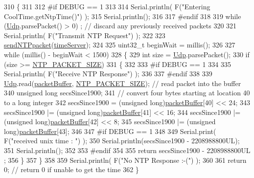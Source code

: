\begin{DoxyCode}
310 \{
311 
312 \textcolor{preprocessor}{#if DEBUG == 1 }
313 
314     Serial.println( F(\textcolor{stringliteral}{"Entering CoolTime.getNtpTime()"}) );
315     Serial.println();
316 
317 \textcolor{preprocessor}{#endif }
318 
319     \textcolor{keywordflow}{while} (\hyperlink{class_cool_time_a4e23216a8121ca79d0fb019f30884b92}{Udp}.parsePacket() > 0) ; \textcolor{comment}{// discard any previously received packets}
320 
321     Serial.println( F(\textcolor{stringliteral}{"Transmit NTP Request"}) );
322 
323     \hyperlink{class_cool_time_a236a38d120dc53bc67456d763838c5a1}{sendNTPpacket}(\hyperlink{class_cool_time_ad2b9858f399108cb440dd1e908916f04}{timeServer});
324 
325     uint32\_t beginWait = millis();
326 
327     \textcolor{keywordflow}{while} (millis() - beginWait < 1500) 
328     \{
329         \textcolor{keywordtype}{int} size = \hyperlink{class_cool_time_a4e23216a8121ca79d0fb019f30884b92}{Udp}.parsePacket();
330         \textcolor{keywordflow}{if} (size >= \hyperlink{_cool_time_8h_a56a6ea64006651b4f42adf713e244f06}{NTP\_PACKET\_SIZE}) 
331         \{
332         
333 \textcolor{preprocessor}{        #if DEBUG == 1}
334 
335             Serial.println( F(\textcolor{stringliteral}{"Receive NTP Response"}) );
336         
337 \textcolor{preprocessor}{        #endif}
338 
339             \hyperlink{class_cool_time_a4e23216a8121ca79d0fb019f30884b92}{Udp}.read(\hyperlink{class_cool_time_a27e6abc82a5c2f72161956967005bec7}{packetBuffer}, \hyperlink{_cool_time_8h_a56a6ea64006651b4f42adf713e244f06}{NTP\_PACKET\_SIZE});  \textcolor{comment}{// read packet into the
       buffer}
340             \textcolor{keywordtype}{unsigned} \textcolor{keywordtype}{long} secsSince1900;
341             \textcolor{comment}{// convert four bytes starting at location 40 to a long integer}
342             secsSince1900 =  (\textcolor{keywordtype}{unsigned} long)\hyperlink{class_cool_time_a27e6abc82a5c2f72161956967005bec7}{packetBuffer}[40] << 24;
343             secsSince1900 |= (\textcolor{keywordtype}{unsigned} long)\hyperlink{class_cool_time_a27e6abc82a5c2f72161956967005bec7}{packetBuffer}[41] << 16;
344             secsSince1900 |= (\textcolor{keywordtype}{unsigned} long)\hyperlink{class_cool_time_a27e6abc82a5c2f72161956967005bec7}{packetBuffer}[42] << 8;
345             secsSince1900 |= (\textcolor{keywordtype}{unsigned} long)\hyperlink{class_cool_time_a27e6abc82a5c2f72161956967005bec7}{packetBuffer}[43];
346         
347 \textcolor{preprocessor}{        #if DEBUG == 1 }
348     
349             Serial.print( F(\textcolor{stringliteral}{"received unix time : "}) );
350             Serial.println(secsSince1900 - 2208988800UL);
351             Serial.println();
352 
353 \textcolor{preprocessor}{        #endif }
354 
355             \textcolor{keywordflow}{return} secsSince1900 - 2208988800UL ;
356         \}
357     \}
358     
359     Serial.println( F(\textcolor{stringliteral}{"No NTP Response :-("}) );
360 
361     \textcolor{keywordflow}{return} 0; \textcolor{comment}{// return 0 if unable to get the time}
362 \}
\end{DoxyCode}
